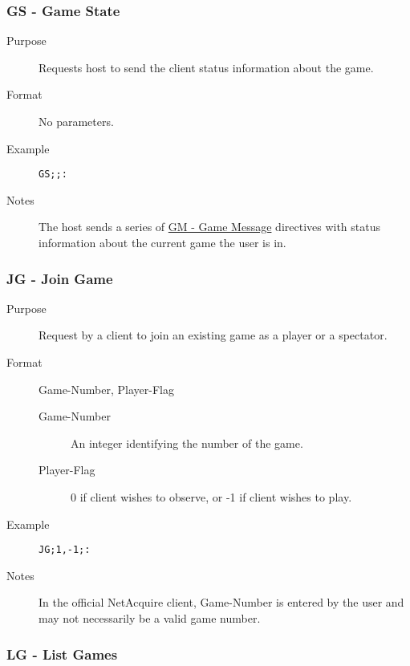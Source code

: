 \documentclass{article}
\providecommand{\wiredata}[1]{\texttt{{#1}}}
\begin{document}

\subsubsection{GS - Game State} %
\label{ssub:gs_game_state}

\begin{description}
  \item[Purpose] Requests host to send the client status information about the game.
  \item[Format] No parameters.
  \item[Example] \wiredata{GS;;:}
  \item[Notes] The host sends a series of \hyperref[ssub:gm_game_message]{GM - Game Message} directives with status information about the current game the user is in.
\end{description}


\subsubsection{JG - Join Game} %
\label{ssub:jg_join_game}

\begin{description}
  \item[Purpose] Request by a client to join an existing game as a player or a spectator.
  \item[Format] Game-Number, Player-Flag
  \begin{description}
    \item[Game-Number] An integer identifying the number of the game.
    \item[Player-Flag] 0 if client wishes to observe, or -1 if client wishes to play.
  \end{description}
  \item[Example] \wiredata{JG;1,-1;:}
  \item[Notes] In the official NetAcquire client, Game-Number is entered by the user and may not necessarily be a valid game number.
\end{description}


\subsubsection{LG - List Games} %
\label{ssub:lg_list_games}
\end{document}
